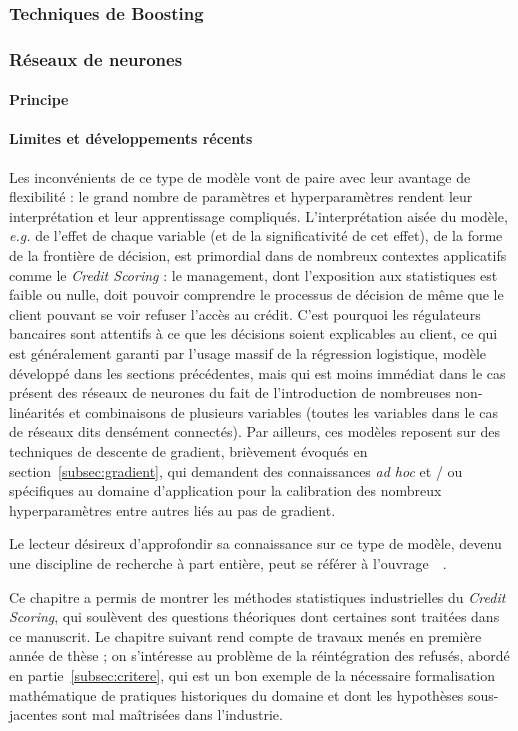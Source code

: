 \subsubsection{Techniques de Boosting}


\subsubsection{Réseaux de neurones}

\paragraph{Principe}

\paragraph{Limites et développements récents}

Les inconvénients de ce type de modèle vont de paire avec leur avantage de flexibilité : le grand nombre de paramètres et hyperparamètres rendent leur interprétation et leur apprentissage compliqués. L'interprétation aisée du modèle, \textit{e.g.} de l'effet de chaque variable (et de la significativité de cet effet), de la forme de la frontière de décision, est primordial dans de nombreux contextes applicatifs comme le \textit{Credit Scoring} : le management, dont l'exposition aux statistiques est faible ou nulle, doit pouvoir comprendre le processus de décision de même que le client pouvant se voir refuser l'accès au crédit. C'est pourquoi les régulateurs bancaires sont attentifs à ce que les décisions soient explicables au client, ce qui est généralement garanti par l'usage massif de la régression logistique, modèle développé dans les sections précédentes, mais qui est moins immédiat dans le cas présent des réseaux de neurones du fait de l'introduction de nombreuses non-linéarités et combinaisons de plusieurs variables (toutes les variables dans le cas de réseaux dits densément connectés). Par ailleurs, ces modèles reposent sur des techniques de descente de gradient, brièvement évoqués en section~\ref{subsec:gradient}, qui demandent des connaissances \textit{ad hoc} et / ou spécifiques au domaine d'application pour la calibration des nombreux hyperparamètres entre autres liés au pas de gradient.

Le lecteur désireux d'approfondir sa connaissance sur ce type de modèle, devenu une discipline de recherche à part entière, peut se référer à l'ouvrage~~\cite{goodfellow2016deep}.


\bigskip

Ce chapitre a permis de montrer les méthodes statistiques industrielles du \textit{Credit Scoring}, qui soulèvent des questions théoriques dont certaines sont traitées dans ce manuscrit. Le chapitre suivant rend compte de travaux menés en première année de thèse ; on s'intéresse au problème de la réintégration des refusés, abordé en partie~\ref{subsec:critere}, qui est un bon exemple de la nécessaire formalisation mathématique de pratiques historiques du domaine et dont les hypothèses sous-jacentes sont mal maîtrisées dans l'industrie.


\printbibliography[heading=subbibliography, title=Références du chapitre 1]